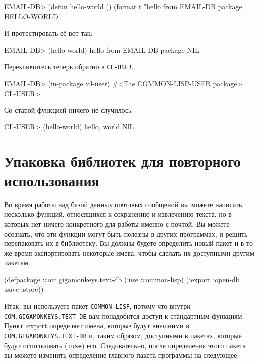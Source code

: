 \begin{myverb}
EMAIL-DB> (defun hello-world () (format t "hello from EMAIL-DB package~%
HELLO-WORLD
\end{myverb}

И протестировать её вот так:

\begin{myverb}
EMAIL-DB> (hello-world)
hello from EMAIL-DB package
NIL
\end{myverb}

Переключитесь теперь обратно в \lstinline{CL-USER}.

\begin{myverb}
EMAIL-DB> (in-package :cl-user)
#<The COMMON-LISP-USER package>
CL-USER> 
\end{myverb}

Со старой функцией ничего не случилось.

\begin{myverb}
CL-USER> (hello-world)
hello, world
NIL
\end{myverb}

\section{Упаковка библиотек для повторного использования}

Во время работы над базой данных почтовых сообщений вы можете написать несколько функций,
относящихся к сохранению и извлечению текста, но в которых нет ничего конкретного для
работы именно с почтой. Вы можете осознать, что эти функции могут быть полезны в других
программах, и решить перепаковать их в библиотеку. Вы должны будете определить новый пакет
и в то же время экспортировать некоторые имена, чтобы сделать их доступными другим
пакетам.

\begin{myverb}
(defpackage :com.gigamonkeys.text-db
  (:use :common-lisp)
  (:export :open-db   
           :save
           :store))
\end{myverb}

Итак, вы используете пакет \lstinline{COMMON-LISP}, потому что внутри
\lstinline{COM.GIGAMONKEYS.TEXT-DB} вам понадобится доступ к стандартным функциям. Пункт
:export определяет имена, которые будут внешними в \lstinline{COM.GIGAMONKEYS.TEXT-DB} и,
таким образом, доступными в пакетах, которые будут использовать (\lstinline{:use}) его. Следовательно,
после определения этого пакета вы можете изменить определение главного пакета программы
на следующее:

